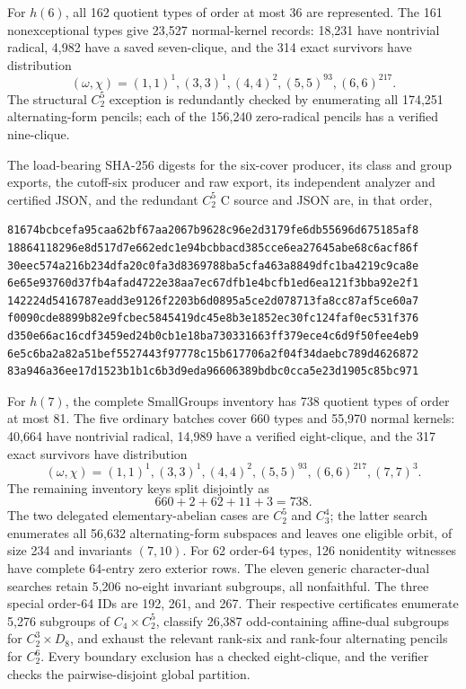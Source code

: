 For $h(6)$, all 162 quotient types of order at most 36 are represented.
The 161 nonexceptional types give 23,527 normal-kernel records: 18,231 have
nontrivial radical, 4,982 have a saved seven-clique, and the 314 exact
survivors have distribution
\[
 (\omega,\chi)=(1,1)^1,(3,3)^1,(4,4)^2,(5,5)^{93},(6,6)^{217}.
\]
The structural $C_2^5$ exception is redundantly checked by enumerating all
174,251 alternating-form pencils; each of the 156,240 zero-radical pencils
has a verified nine-clique.

The load-bearing SHA-256 digests for the six-cover producer, its class and
group exports, the cutoff-six producer and raw export, its independent
analyzer and certified JSON, and the redundant $C_2^5$ C source and JSON are,
in that order,
\begin{verbatim}
81674bcbcefa95caa62bf67aa2067b9628c96e2d3179fe6db55696d675185af8
18864118296e8d517d7e662edc1e94bcbbacd385cce6ea27645abe68c6acf86f
30eec574a216b234dfa20c0fa3d8369788ba5cfa463a8849dfc1ba4219c9ca8e
6e65e93760d37fb4afad4722e38aa7ec67dfb1e4bcfb1ed6ea121f3bba92e2f1
142224d5416787eadd3e9126f2203b6d0895a5ce2d078713fa8cc87af5ce60a7
f0090cde8899b82e9fcbec5845419dc45e8b3e1852ec30fc124faf0ec531f376
d350e66ac16cdf3459ed24b0cb1e18ba730331663ff379ece4c6d9f50fee4eb9
6e5c6ba2a82a51bef5527443f97778c15b617706a2f04f34daebc789d4626872
83a946a36ee17d1523b1b1c6b3d9eda96606389bdbc0cca5e23d1905c85bc971
\end{verbatim}

For $h(7)$, the complete SmallGroups inventory has 738 quotient types of
order at most 81.  The five ordinary batches cover 660 types and 55,970
normal kernels: 40,664 have nontrivial radical, 14,989 have a verified
eight-clique, and the 317 exact survivors have distribution
\[
 (\omega,\chi)=(1,1)^1,(3,3)^1,(4,4)^2,(5,5)^{93},
 (6,6)^{217},(7,7)^3.
\]
The remaining inventory keys split disjointly as
\[
 660+2+62+11+3=738.
\]
The two delegated elementary-abelian cases are $C_2^5$ and $C_3^4$; the
latter search enumerates all 56,632 alternating-form subspaces and leaves
one eligible orbit, of size 234 and invariants $(7,10)$.  For 62 order-64
types, 126 nonidentity witnesses have complete 64-entry zero exterior rows.
The eleven generic character-dual searches retain 5,206 no-eight invariant
subgroups, all nonfaithful.  The three special order-64 IDs are 192, 261,
and 267.  Their respective certificates enumerate 5,276 subgroups of
$C_4\times C_2^5$, classify 26,387 odd-containing affine-dual subgroups for
$C_2^3\times D_8$, and exhaust the relevant rank-six and rank-four
alternating pencils for $C_2^6$.  Every boundary exclusion has a checked
eight-clique, and the verifier checks the pairwise-disjoint global partition.

